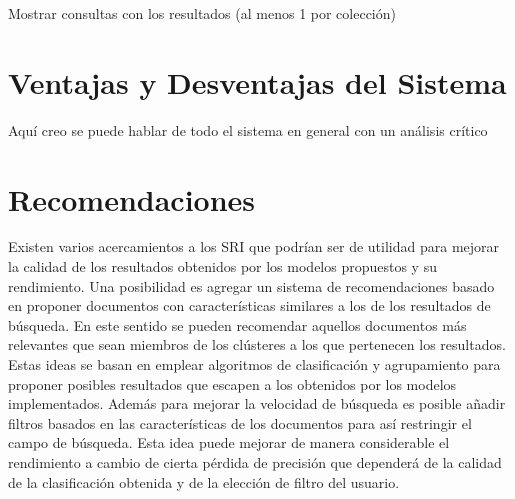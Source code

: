 \documentclass[12pt]{llncs}
\begin{document}
Mostrar consultas con los resultados (al menos 1 por colección)

\section{Ventajas y Desventajas del Sistema}

Aquí creo se puede hablar de todo el sistema en general con un análisis crítico

\section*{Recomendaciones}

Existen varios acercamientos a los SRI que podrían ser de utilidad para mejorar la calidad de los resultados obtenidos por los modelos propuestos y su rendimiento. Una posibilidad es agregar un sistema de recomendaciones basado en proponer documentos con características similares a los de los resultados de búsqueda. En este sentido se pueden recomendar aquellos documentos más relevantes que sean miembros de los clústeres a los que pertenecen los resultados. Estas ideas se basan en emplear algoritmos de clasificación y agrupamiento para proponer posibles resultados que escapen a los obtenidos por los modelos implementados. Además para mejorar la velocidad de búsqueda es posible añadir filtros basados en las características de los documentos para así restringir el campo de búsqueda. Esta idea puede mejorar de manera considerable el rendimiento a cambio de cierta pérdida de precisión que dependerá de la calidad de la clasificación obtenida y de la elección de filtro del usuario.


 

\end{document}

